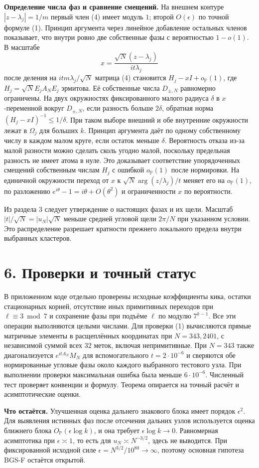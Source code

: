 \documentclass[11pt,a4paper]{article}
\newcommand{\sect}[1]{\section*{\sffamily\color{ink}#1}}
\newcommand{\subt}[1]{\par\medskip\noindent\textbf{#1.}\quad}
\begin{document}
\subt{Определение числа фаз и сравнение смещений}
На внешнем контуре \(|z-\lambda_j|=1/m\) первый член (4) имеет модуль \(1\); второй \(O(\epsilon)\) по точной формуле (1). Принцип аргумента через линейное добавление остальных членов показывает, что внутри ровно две собственные фазы с вероятностью \(1-o(1)\). В масштабе
\[
                       x=\frac{\sqrt N(z-\lambda_j)}{i t\lambda_j}
\]
после деления на \(itm\lambda_j/\sqrt N\) матрица (4) становится \(H_j-xI+o_{\mathbb P}(1)\), где \(H_j=\sqrt N E_j A_N E_j\) эрмитова. Её собственные числа \(D_{\pm,N}\) равномерно ограничены. На двух окружностях фиксированного малого радиуса \(\delta\) в \(x\)-переменной вокруг \(D_{\pm,N}\), если разность больше \(2\delta\), обратная норма \((H_j-xI)^{-1}\le1/\delta\). При таком выборе внешний и обе внутренние окружности лежат в \(\Omega_j\) для больших \(k\). Принцип аргумента даёт по одному собственному числу в каждом малом круге, если остаток меньше \(\delta\). Вероятность отказа из-за малой разности можно сделать сколь угодно малой, поскольку предельная разность не имеет атома в нуле. Это доказывает соответствие упорядоченных смещений собственным числам \(H_j\) с ошибкой \(o_{\mathbb P}(1)\) после нормировки. На единичной окружности переход от \(x\) к \(\sqrt N\arg(z/\lambda_j)/t\) меняет его на \(o_{\mathbb P}(1)\), по разложению \(e^{i\theta}-1=i\theta+O(\theta^2)\) и ограниченности \(x\) по вероятности.

Из раздела 3 следует утверждение о настоящих фазах и их щели. Масштаб \(|t|/\sqrt N=|u_N|\sqrt N\) меньше средней угловой щели \(2\pi/N\) при указанном условии. Это распределение разрешает кратности прежнего локального предела внутри выбранных кластеров.
\newpage
\sect{6. Проверки и точный статус}
В приложенном коде отдельно проверены исходные коэффициенты кика, остатки стационарных корней, отсутствие иных примитивных переходов при \(\ell\equiv3\bmod7\) и сохранение фазы при подъёме \(\ell\) по модулю \(7^{k-1}\). Все эти операции выполняются целыми числами. Для проверки (1) вычисляются прямые матричные элементы в расщеплённых координатах при \(N=343,2401\), с независимой суммой всех \(32\) меток, включая непримитивные. При \(N=343\) также диагонализуется \(e^{itA_N}M_N\) для вспомогательного \(t=2\cdot10^{-6}\) и сверяются обе нормированные угловые фазы около каждого выбранного тестового узла. При выполнении проверки максимальная ошибка была меньше \(6\cdot10^{-6}\). Численный тест проверяет конвенции и формулу. Теорема опирается на точный расчёт и асимптотические оценки.

\subt{Что остаётся}
Улучшенная оценка дальнего знакового блока имеет порядок \(\epsilon^2\). Для выявления истинных фаз после отсечения дальних узлов используется оценка ближнего блока \(O_{\mathbb P}(\epsilon\log k)\), и она требует \(\epsilon\log k\to0\). Равномерная асимптотика при \(\epsilon\asymp1\), то есть для \(u_N\asymp N^{-3/2}\), здесь не выводится. При фиксированной исходной силе \(\epsilon=N^{3/2}/10^{80}\to\infty\), поэтому основная гипотеза BGS-F остаётся открытой.
\end{document}

